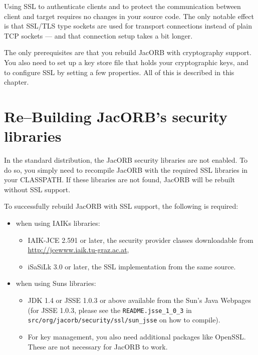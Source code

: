 

Using  SSL to authenticate  clients and  to protect  the communication
between client and target requires no changes in your source code. The
only  notable  effect  is  that  SSL/TLS type  sockets  are  used  for
transport  connections  instead of  plain  TCP  sockets  --- and  that
connection setup takes a bit longer.

The only  prerequisites are that you rebuild  JacORB with cryptography
support. You  also need  to set up  a key  store file that  holds your
cryptographic   keys,  and  to   configure  SSL   by  setting   a  few
properties. All of this is described in this chapter.

\section{Re--Building JacORB's security libraries}

In the  standard distribution, the  JacORB security libraries  are not
enabled.   To do  so, you  simply need  to recompile  JacORB  with the
required SSL libraries  in your CLASSPATH.  If these libraries
are not found, JacORB will be rebuilt without SSL support.

To  successfully rebuild  JacORB with  SSL support,  the  following is
required:

\begin{itemize}
        \item when using IAIKs libraries:
              \begin{itemize}
                \item IAIK-JCE 2.591 or later, the security provider classes
                downloadable from \\ \href{http://jcewww.iaik.tu-graz.ac.at}{http://jcewww.iaik.tu-graz.ac.at},
              \item iSaSiLk 3.0 or later, the SSL implementation from the same
                source.
              \end{itemize}

        \item when using Suns libraries:
              \begin{itemize}
              \item JDK 1.4 or JSSE 1.0.3 or above available from the
                Sun's Java Webpages (for JSSE 1.0.3, please see the
                {\tt README.jsse\_1\_0\_3} in
                {\tt src/org/jacorb/security/ssl/sun\_jsse} on how to compile).
              \item For key management, you also need additional packages like
                OpenSSL. These are not necessary for JacORB to work.
              \end{itemize}
\end{itemize}

